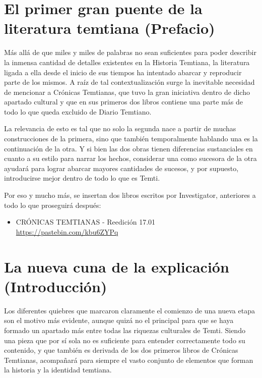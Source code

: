 \documentclass[
  spanish,
]{book}
\providecommand{\tightlist}{%
  \setlength{\itemsep}{0pt}\setlength{\parskip}{0pt}}
\begin{document}
\hypertarget{el-primer-gran-puente-de-la-literatura-temtiana-prefacio}{%
\chapter{El primer gran puente de la literatura temtiana (Prefacio)}\label{el-primer-gran-puente-de-la-literatura-temtiana-prefacio}}

Más allá de que miles y miles de palabras no sean suficientes para poder describir la inmensa cantidad de detalles existentes en la Historia Temtiana, la literatura ligada a ella desde el inicio de sus tiempos ha intentado abarcar y reproducir parte de los mismos. A raíz de tal contextualización surge la inevitable necesidad de mencionar a Crónicas Temtianas, que tuvo la gran iniciativa dentro de dicho apartado cultural y que en sus primeros dos libros contiene una parte más de todo lo que queda excluido de Diario Temtiano.

La relevancia de esto es tal que no solo la segunda nace a partir de muchas construcciones de la primera, sino que también temporalmente hablando una es la continuación de la otra. Y si bien las dos obras tienen diferencias sustanciales en cuanto a su estilo para narrar los hechos, considerar una como sucesora de la otra ayudará para lograr abarcar mayores cantidades de sucesos, y por supuesto, introducirse mejor dentro de todo lo que es Temti.

Por eso y mucho más, se insertan dos libros escritos por Investigator, anteriores a todo lo que proseguirá después:

\begin{itemize}
\tightlist
\item
  CRÓNICAS TEMTIANAS - Reedición 17.01 \url{https://pastebin.com/kbu6ZYPq}
\end{itemize}

\hypertarget{la-nueva-cuna-de-la-explicaciuxf3n-introducciuxf3n}{%
\chapter{La nueva cuna de la explicación (Introducción)}\label{la-nueva-cuna-de-la-explicaciuxf3n-introducciuxf3n}}

Los diferentes quiebres que marcaron claramente el comienzo de una nueva etapa son el motivo más evidente, aunque quizá no el principal para que se haya formado un apartado más entre todas las riquezas culturales de Temti. Siendo una pieza que por sí sola no es suficiente para entender correctamente todo su contenido, y que también es derivada de los dos primeros libros de Crónicas Temtianas, acompañará para siempre el vasto conjunto de elementos que forman la historia y la identidad temtiana.
\end{document}
